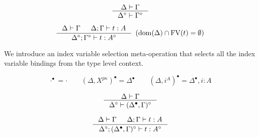 \begin{theorem}
\label{thm:Fixierasetmctx}
\[ \inference{\Delta |- \Gamma}{\Delta^\circ |- \Gamma^\circ} \]
\end{theorem}

\begin{theorem}
\label{thm:Fixierasetypingifree}
\[ \inference{ \Delta |- \Gamma & \Delta;\Gamma |- t : A}
		{\Delta^\circ;\Gamma^\circ |- t : A^\circ}
		{\enspace(\dom(\Delta)\cap\FV(t) = \emptyset)}
\]
\end{theorem}


We introduce an index variable selection meta-operation that selects all
the index variable bindings from the type level context.
\begin{definition}
\[ \cdot^\bullet = \cdot \qquad
	(\Delta,X^{p\kappa})^\bullet = \Delta^\bullet \qquad
	(\Delta,i^A)^\bullet = \Delta^\bullet,i:A
\]
\end{definition}

\begin{theorem}
\label{thm:Fixierasetmctxivs}
\[ \inference{\Delta |- \Gamma}{\Delta^\circ |- (\Delta^\bullet,\Gamma)^\circ}
\]
\end{theorem}

\begin{theorem}
\label{thm:Fixierasetypingall}
\[ \inference{\Delta |- \Gamma & \Delta;\Gamma |- t : A}
		{\Delta^\circ;(\Delta^\bullet,\Gamma)^\circ |- t : A^\circ}
\]
\end{theorem}



